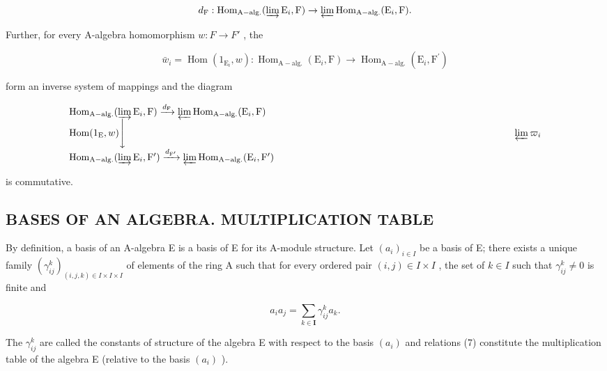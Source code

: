 \[
d _ {\mathrm{F}}: \operatorname{Hom} _ {\mathrm{A-alg.}} (\varinjlim \mathrm{E} _ {i}, \mathrm{F}) \rightarrow \varprojlim \operatorname{Hom} _ {\mathrm{A-alg.}} (\mathrm{E} _ {i}, \mathrm{F}).
\]

Further, for every A-algebra homomorphism \(w: F \rightarrow F'\) , the

\[
\bar {w} _ {i} = \operatorname{Hom} (1 _ {\mathrm{E} _ {i}}, w): \operatorname{Hom} _ {\mathrm{A-alg.}} (\mathrm{E} _ {i}, \mathrm{F}) \rightarrow \operatorname{Hom} _ {\mathrm{A-alg.}} (\mathrm{E} _ {i}, \mathrm{F} ^ {\prime})
\]

form an inverse system of mappings and the diagram

\[
\begin{array}{l} \operatorname{Hom} _ {\mathrm{A-alg.}} (\varinjlim \mathrm{E} _ {i}, \mathrm{F}) \xrightarrow {d _ {\mathrm{F}}} \varprojlim \operatorname{Hom} _ {\mathrm{A-alg.}} (\mathrm{E} _ {i}, \mathrm{F}) \\ \operatorname{Hom} (1 _ {\mathrm{E}}, w) \Biggl \downarrow \qquad \qquad \qquad \qquad \qquad \qquad \qquad \qquad \qquad \qquad \qquad \qquad \qquad \qquad \qquad \qquad \qquad \qquad \qquad \qquad \varprojlim \varpi_ {i} \\ \operatorname{Hom} _ {\mathrm{A-alg.}} (\varinjlim \mathrm{E} _ {i}, \mathrm{F} ^ {\prime}) \xrightarrow {d _ {\mathrm{F} ^ {\prime}}} \varprojlim \operatorname{Hom} _ {\mathrm{A-alg.}} (\mathrm{E} _ {i}, \mathrm{F} ^ {\prime}) \end{array}
\]

is commutative.

\subsection{BASES OF AN ALGEBRA. MULTIPLICATION TABLE}

By definition, a basis of an A-algebra E is a basis of E for its A-module structure. Let \((a_{i})_{i\in I}\) be a basis of E; there exists a unique family \((\gamma_{ij}^{k})_{(i,j,k)\in I\times I\times I}\) of elements of the ring A such that for every ordered pair \((i,j)\in I\times I\) , the set of \(k\in I\) such that \(\gamma_{ij}^{k}\neq 0\) is finite and

\[
a _ {i} a _ {j} = \sum_ {k \in \mathbf {I}} \gamma_ {i j} ^ {k} a _ {k}.\tag{7}
\]

The \(\gamma_{ij}^{k}\) are called the constants of structure of the algebra E with respect to the basis \((a_{i})\) and relations (7) constitute the multiplication table of the algebra E (relative to the basis \((a_{i})\) ).

